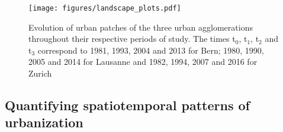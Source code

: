 \documentclass[10pt,letterpaper]{article}
\begin{document}
\begin{figure}[!ht]
  \begin{adjustwidth}{-.4\textwidth}{0cm}
    \centering  
    \texttt{[image: figures/landscape\_plots.pdf]}
    \caption[Evolution of urban patches]{\label{figures/landscape_plots.pdf}Evolution of urban patches of the three urban agglomerations throughout their respective periods of study. The times t$_0$, t$_1$, t$_2$ and t$_3$ correspond to 1981, 1993, 2004 and 2013 for Bern; 1980, 1990, 2005 and 2014 for Lausanne and 1982, 1994, 2007 and 2016 for Zurich}
  \end{adjustwidth}
\end{figure}

\subsection*{Quantifying spatiotemporal patterns of urbanization}
\end{document}
